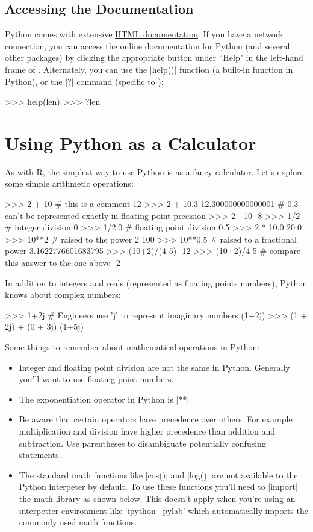 \subsection{Accessing the Documentation}

Python comes with extensive \href{http://docs.python.org/}{HTML documentation}. If you have a network connection, you can access the online documentation for Python (and several other packages) by clicking the appropriate button under ``Help" in the left-hand frame of \ipy. Alternately, you can use the |help()| function (a built-in function in Python), or the |?| command (specific to \ipython):
%
\begin{python}
>>> help(len)
>>> ?len
\end{python}



\section{Using Python as a Calculator}

As with R, the simplest way to use Python is as a fancy calculator.
Let's explore some simple arithmetic operations:
%
\begin{python}
>>> 2 + 10   # this is a comment
12
>>> 2 + 10.3
 12.300000000000001  # 0.3 can't be represented exactly in floating point precision
>>> 2 - 10
-8
>>> 1/2  # integer division
0
>>> 1/2.0  # floating point division
0.5
>>> 2 * 10.0
20.0
>>> 10**2  # raised to the power 2
100
>>> 10**0.5  # raised to a fractional power
3.1622776601683795
>>> (10+2)/(4-5)
-12
>>> (10+2)/4-5  # compare this answer to the one above 
-2
\end{python}
%
In addition to integers and reals (represented as floating points
numbers), Python knows about complex numbers:
%
\begin{python}
>>> 1+2j  # Engineers use 'j' to represent imaginary numbers
(1+2j)
>>> (1 + 2j) + (0 + 3j)
(1+5j)
\end{python}

Some things to remember about mathematical operations in Python:
\begin{itemize}
\item
  Integer and floating point division are not the same in Python.
  Generally you'll want to use floating point numbers.
\item
  The exponentiation operator in Python is |**|
\item
  Be aware that certain operators have precedence over others. For
  example multiplication and division have higher precedence than
  addition and subtraction. Use parentheses to disambiguate potentially
  confusing statements.
\item
  The standard math functions like |cos()| and
  |log()| are not available to the Python interpeter by
  default. To use these functions you'll need to |import| the
  math library as shown below.  This doesn't apply when you're using an 
  interpetter environment like `ipython --pylab' which automatically
  imports the commonly used math functions.
\end{itemize}

